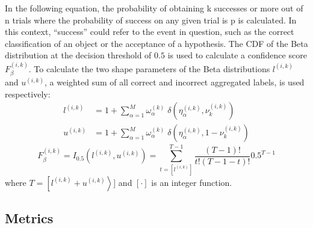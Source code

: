 In the following equation, the probability of obtaining k successes or more out of n trials where the probability of success on any given trial is p is calculated. In this context, ``success'' could refer to the event in question, such as the correct classification of an object or the acceptance of a hypothesis. The CDF of the Beta distribution at the decision threshold of $0.5 $ is used to calculate a confidence score $F_{\beta}^{(i,k)}$. To calculate the two shape parameters of the Beta distributions $l^{(i,k)}$ and $u^{(i,k)}$, a weighted sum of all correct and incorrect aggregated labels, is used respectively:
\begin{equation}
    \begin{aligned}
        l^{(i,k)} &= 1 + \sum_{\alpha=1}^{M} \omega_{\alpha}^{(k)} \; \delta\left(\eta_{\alpha}^{(i,k)}, \nu_{k}^{(i,k)}\right) \\
        u^{(i,k)} &= 1 + \sum_{\alpha=1}^{M} \omega_{\alpha}^{(k)} \; \delta\left(\eta_{\alpha}^{(i,k)}, 1 - \nu_{k}^{(i,k)}\right)
    \end{aligned}
    \label{eq:crowd.Eq.14.beta_l_u}
\end{equation}
%
\begin{equation}
    F_{\beta}^{(i,k)} =I_{0.5}\left(l^{(i,k)},u^{(i,k)}\right)=\sum_{t=[l^{(i,k)}]}^{T-1}\frac{(T-1)!}{t!(T-1-t)!}0.5^{T-1}
    \label{eq:crowd.Eq.15.confidence-score.Beta}
\end{equation}
where $T = \left [ l^{(i,k)} + u^{(i,k)} \right >] $ and $\left [ \cdot \right ] $ is an integer function.

\subsection{Metrics}

